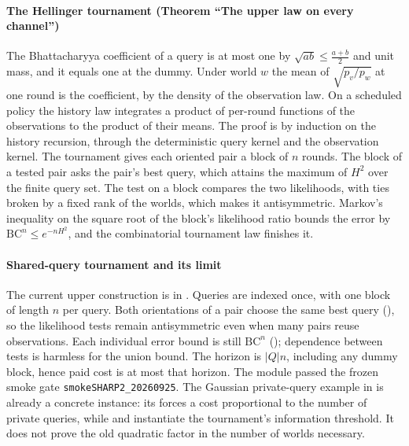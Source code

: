 \paragraph{The Hellinger tournament (Theorem ``The upper law on every channel'')} The
Bhattacharyya coefficient of a query is at most one by $\sqrt{ab}\le\frac{a+b}{2}$ and unit mass,
and it equals one at the dummy. Under world $w$ the mean of $\sqrt{p_{v}/p_{w}}$ at one round is the
coefficient, by the density of the observation law. On a scheduled policy the history law
integrates a product of per-round functions of the observations to the product of their means. The
proof is by induction on the history recursion, through the deterministic query kernel and the
observation kernel. The tournament gives each oriented pair a block of $n$ rounds. The block of a
tested pair asks the pair's best query, which attains the maximum of $H^{2}$ over the finite query
set. The test on a block compares the two likelihoods, with ties broken by a fixed rank of the
worlds, which makes it antisymmetric. Markov's inequality on the square root of the block's
likelihood ratio bounds the error by $\mathrm{BC}^{n}\le e^{-nH^{2}}$, and the combinatorial
tournament law finishes it.


\paragraph{Shared-query tournament and its limit}
The current upper construction is  in
. Queries are indexed once, with one block of length $n$
per query. Both orientations of a pair choose the same best query (),
so the likelihood tests remain antisymmetric even when many pairs reuse observations.
Each individual error bound is still $\mathrm{BC}^n$ (); dependence
between tests is harmless for the union bound. The horizon is $|Q|n$, including any dummy
block, hence paid cost is at most that horizon.
The module passed the frozen smoke gate \texttt{smokeSHARP2\_20260925}. The Gaussian private-query
example in  is already a concrete instance: its
 forces a cost proportional to the number of private queries,
while  and  instantiate the tournament's information threshold.
It does not prove the old quadratic factor in the number of worlds necessary.

